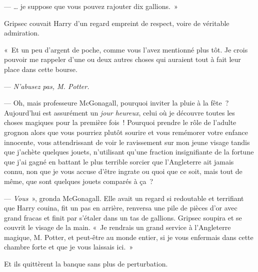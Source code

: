 --- … je suppose que vous pouvez rajouter dix gallions.~»

Gripsec couvait Harry d'un regard empreint de respect, voire de véritable admiration.

«~Et un peu d'argent de poche, comme vous l'avez mentionné plus tôt. Je crois pouvoir me rappeler d'une ou deux autres choses qui auraient tout à fait leur place dans cette bourse.

--- \emph{N'abusez pas, M. Potter.}

--- Oh, mais professeure McGonagall, pourquoi inviter la pluie à la fête~?  Aujourd'hui est assurément un \emph{jour heureux}, celui où je découvre toutes les choses magiques pour la première fois~!  Pourquoi prendre le rôle de l'adulte grognon alors que vous pourriez plutôt sourire et vous remémorer votre enfance innocente, vous attendrissant de voir le ravissement sur mon jeune visage tandis que j'achète quelques jouets, n'utilisant qu'une fraction insignifiante de la fortune que j'ai gagné en battant le plus terrible sorcier que l'Angleterre ait jamais connu, non que je vous accuse d'être ingrate ou quoi que ce soit, mais tout de même, que sont quelques jouets comparés à ça~?

--- \emph{Vous}~», gronda McGonagall. Elle avait un regard si redoutable et terrifiant que Harry couina, fit un pas en arrière, renversa une pile de pièces d'or avec grand fracas et finit par s'étaler dans un tas de gallions. Gripsec soupira et se couvrit le visage de la main. «~Je rendrais un grand service à l'Angleterre magique, M. Potter, et peut-être au monde entier, si je vous enfermais dans cette chambre forte et que je vous laissais ici.~»

Et ils quittèrent la banque sans plus de perturbation.
